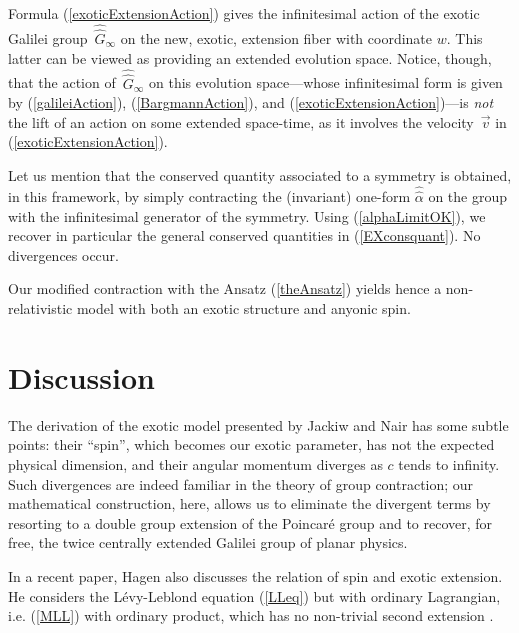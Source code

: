 \documentclass[a4paper,11pt]{article}
\let\ssection=\section
\renewcommand{\section}{\setcounter{equation}{0}\ssection}
\def\vv{{\vec v}}
\begin{document}
Formula (\ref{exoticExtensionAction}) gives the
infinitesimal action of the exotic Galilei
group $\,\widehat{\!\widehat{G}}_\infty$ on the new, exotic,
extension fiber with coordinate $w$. This latter can be viewed as providing an
extended evolution space.
Notice, though, that the action of
$\,\widehat{\!\widehat{G}}_\infty$ on this evolution space---whose
infinitesimal
form is given by (\ref{galileiAction}),
(\ref{BargmannAction}), and
(\ref{exoticExtensionAction})---is {\it not} the lift of an
action on some extended space-time, as it involves the velocity~$\vv$ in
(\ref{exoticExtensionAction}).


Let us mention that the conserved quantity associated to a symmetry
is obtained, in this framework, by simply contracting the (invariant)
one-form $\widehat{\!\widehat{\alpha}}$ on the group with the
infinitesimal generator of the
 symmetry. Using (\ref{alphaLimitOK}),
we recover in particular the general conserved
quantities in (\ref{EXconsquant}). No divergences occur.

Our modified contraction  with the  Ansatz (\ref{theAnsatz})
yields hence a non-relativistic model
with both an exotic structure and anyonic spin.


\section{Discussion}

The derivation of the exotic model presented by Jackiw and Nair
\cite{JaNa2} has
some subtle points: their ``spin'', which becomes our exotic parameter, has
not the expected physical dimension, and their angular momentum diverges as
$c$ tends to infinity. Such divergences are indeed familiar in the theory
of group contraction; our mathematical construction, here, allows us to
eliminate
the divergent terms by resorting to a double group extension of the Poincar\'e
group and to recover, for free, the twice centrally extended Galilei group of
planar physics.

In a recent paper, Hagen \cite{Hagen} also discusses the relation
of spin and exotic extension. He considers the
L\'evy-Leblond equation (\ref{LLeq})
but with ordinary Lagrangian, i.e. (\ref{MLL}) with
ordinary product, which has no  non-trivial second extension \cite{LL}.
\end{document}
